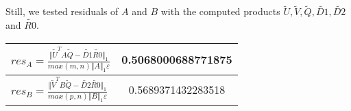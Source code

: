 \begin{example}
{\begin{enumerate}[(1).]
Still, we tested residuals of $A$ and $B$ with the computed products $\tilde{U}, \tilde{V}, \tilde{Q}, \tilde{D1}, \tilde{D2}$ and $\tilde{R0}$.

\begin{center}
	\bgroup
	\def\arraystretch{2}%
		\begin{tabular}{| m{}|| c |}
			\hline
    			$res_{A} = \frac{\Vert \tilde{U}^TA\tilde{Q} - \tilde{D1}\tilde{R0}\Vert_1}{max(m,n)\Vert A \Vert_1 \varepsilon}$ & 0.5068000688771875 \\ \hline
				$res_{B} = \frac{\Vert \tilde{V}^TB\tilde{Q} - \tilde{D2}\tilde{R0}\Vert_1}{max(p,n)\Vert B \Vert_1 \varepsilon}$ & 0.5689371432283518 \\ 
			\hline
		\end{tabular}
	\egroup
\end{center}

\end{enumerate} 
} 
\end{example} 


